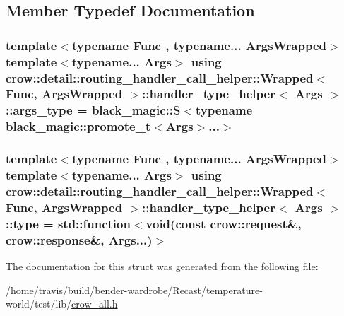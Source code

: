 \subsection{Member Typedef Documentation}
\hypertarget{structcrow_1_1detail_1_1routing__handler__call__helper_1_1_wrapped_1_1handler__type__helper_a9914a4b757ed58f4a938a45b26774055}{
\subsubsection[{args\-\_\-type}]{\setlength{\rightskip}{0pt plus 5cm}template$<$typename Func , typename... Args\-Wrapped$>$ template$<$typename... Args$>$ using {\bf crow\-::detail\-::routing\-\_\-handler\-\_\-call\-\_\-helper\-::\-Wrapped}$<$ Func, Args\-Wrapped $>$\-::{\bf handler\-\_\-type\-\_\-helper}$<$ Args $>$\-::{\bf args\-\_\-type} =  {\bf black\-\_\-magic\-::\-S}$<$typename {\bf black\-\_\-magic\-::promote\-\_\-t}$<$Args$>$...$>$}}\label{structcrow_1_1detail_1_1routing__handler__call__helper_1_1_wrapped_1_1handler__type__helper_a9914a4b757ed58f4a938a45b26774055}
\hypertarget{structcrow_1_1detail_1_1routing__handler__call__helper_1_1_wrapped_1_1handler__type__helper_a4c2a9a1065506309bd9b8a37d6518e3e}{
\subsubsection[{type}]{\setlength{\rightskip}{0pt plus 5cm}template$<$typename Func , typename... Args\-Wrapped$>$ template$<$typename... Args$>$ using {\bf crow\-::detail\-::routing\-\_\-handler\-\_\-call\-\_\-helper\-::\-Wrapped}$<$ Func, Args\-Wrapped $>$\-::{\bf handler\-\_\-type\-\_\-helper}$<$ Args $>$\-::{\bf type} =  std\-::function$<$void(const {\bf crow\-::request}\&, {\bf crow\-::response}\&, Args...)$>$}}\label{structcrow_1_1detail_1_1routing__handler__call__helper_1_1_wrapped_1_1handler__type__helper_a4c2a9a1065506309bd9b8a37d6518e3e}


The documentation for this struct was generated from the following file\-:\begin{DoxyCompactItemize}
\item 
/home/travis/build/bender-\/wardrobe/\-Recast/temperature-\/world/test/lib/\hyperlink{crow__all_8h}{crow\-\_\-all.\-h}\end{DoxyCompactItemize}
